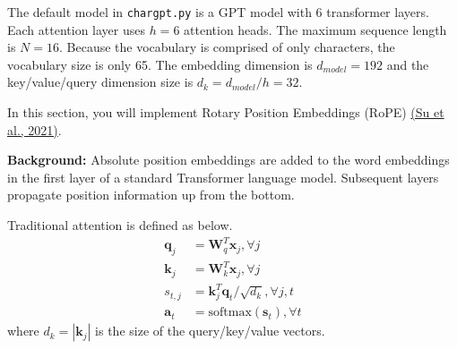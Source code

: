 \documentclass[11pt,addpoints,answers]{exam}
\newcommand{\av}{\mathbf{a}}
\newcommand{\kv}{\mathbf{k}}
\newcommand{\qv}{\mathbf{q}}
\newcommand{\sv}{\mathbf{s}}
\newcommand{\xv}{\mathbf{x}}
\newcommand{\Wv}{\mathbf{W}}
\begin{document}
\begin{questions}

The default model in \lstinline{chargpt.py} is a GPT model with 6 transformer layers. Each attention layer uses $h=6$ attention heads. The maximum sequence length is $N=16$. Because the vocabulary is comprised of only characters, the vocabulary size is only 65. The embedding dimension is $d_{model} = 192$ and the key/value/query dimension size is $d_k = d_{model}/h =32$. 

\clearpage


    In this section, you will implement Rotary Position Embeddings (RoPE) \href{https://arxiv.org/pdf/2104.09864.pdf}{(Su et al., 2021)}. 


    \textbf{Background:}
    Absolute position embeddings are added to the word embeddings in the first layer of a standard Transformer language model. Subsequent layers propagate position information up from the bottom. 

    Traditional attention is defined as below.
    \begin{align*}
        \qv_j &= \Wv_q^T \xv_j, \forall j \\
        \kv_j &= \Wv_k^T \xv_j, \forall j \\
        s_{t,j} &= \kv_j^T \qv_t / \sqrt{d_k}, \forall j,t\\
        \av_t &= \text{softmax}(\sv_t), \forall t
    \end{align*}
    where $d_k = |\kv_j|$ is the size of the query/key/value vectors.


\end{questions}
\end{document}
